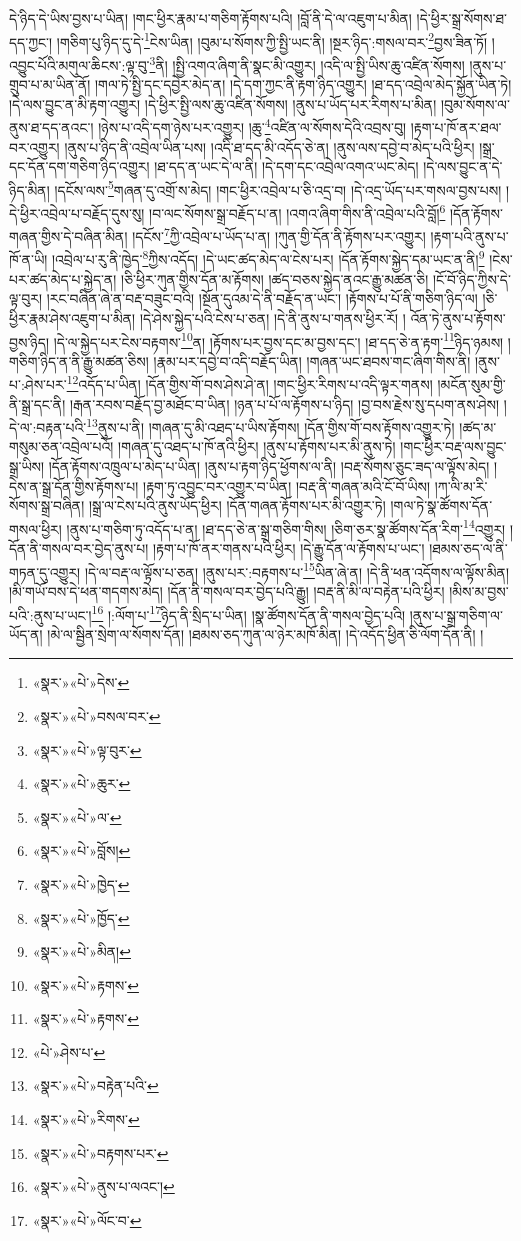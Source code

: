དེ་ཉིད་དེ་ཡིས་བྱས་པ་ཡིན། །གང་ཕྱིར་རྣམ་པ་གཅིག་རྟོགས་པའི། །བློ་ནི་དེ་ལ་འཇུག་པ་མིན། །དེ་ཕྱིར་སྒྲ་སོགས་ཐ་དད་ཀྱང་། །གཅིག་པུ་ཉིད་དུ་དེ་\footnote{«སྣར་»«པེ་»དེས་}ངེས་ཡིན། །བུམ་པ་སོགས་ཀྱི་སྤྱི་ཡང་ནི། །སྔར་ཉིད་:གསལ་བར་\footnote{«སྣར་»«པེ་»བསལ་བར་}བྱས་ཟིན་ཏོ། །འབྱུང་པོའི་མགུལ་ཆིངས་:ལྟ་བུ་\footnote{«སྣར་»«པེ་»ལྟ་བུར་}ནི། །སྤྱི་འགའ་ཞིག་ནི་སྣང་མི་འགྱུར། །འདི་ལ་སྤྱི་ཡིས་ཆུ་འཛིན་སོགས། །ནུས་པ་གྲུབ་པ་མ་ཡིན་ནོ། །གལ་ཏེ་སྤྱི་དང་དབྱེར་མེད་ན། །དེ་དག་ཀྱང་ནི་རྟག་ཉིད་འགྱུར། །ཐ་དད་འབྲེལ་མེད་སྐྱོན་ཡིན་ཏེ། །དེ་ལས་བྱུང་ན་མི་རྟག་འགྱུར། །དེ་ཕྱིར་སྤྱི་ལས་ཆུ་འཛིན་སོགས། །ནུས་པ་ཡོད་པར་རིགས་པ་མིན། །བུམ་སོགས་ལ་ནུས་ཐ་དད་ནའང་། །ཉེས་པ་འདི་དག་ཉེས་པར་འགྱུར། །ཆུ་\footnote{«སྣར་»«པེ་»ཆུར་}འཛིན་ལ་སོགས་དེའི་འབྲས་བུ། །རྟག་པ་ཁོ་ནར་ཐལ་བར་འགྱུར། །ནུས་པ་ཉིད་ནི་འབྲེལ་ཡིན་པས། །འདི་ཐ་དད་མི་འདོད་ཅེ་ན། །ནུས་ལས་དབྱེ་བ་མེད་པའི་ཕྱིར། །སྒྲ་དང་དོན་དག་གཅིག་ཉིད་འགྱུར། །ཐ་དད་ན་ཡང་དེ་ལ་ནི། །དེ་དག་དང་འབྲེལ་འགའ་ཡང་མེད། །དེ་ལས་བྱུང་ན་དེ་ཉིད་མིན། །དངོས་ལས་\footnote{«སྣར་»«པེ་»ལ་}གཞན་དུ་འགྲོ་ས་མེད། །གང་ཕྱིར་འབྲེལ་པ་ཅི་འདྲ་བ། །དེ་འདྲ་ཡོད་པར་གསལ་བྱས་པས། །དེ་ཕྱིར་འབྲེལ་པ་བརྗོད་དུས་སུ། །བ་ལང་སོགས་སྒྲ་བརྗོད་པ་ན། །འགའ་ཞིག་གིས་ནི་འབྲེལ་པའི་བློ།\footnote{«སྣར་»«པེ་»བློས།} །དོན་རྟོགས་གཞན་གྱིས་དེ་བཞིན་མིན། །དངོས་\footnote{«སྣར་»«པེ་»ཁྱེད་}ཀྱི་འབྲེལ་པ་ཡོད་པ་ན། །ཀུན་གྱི་དོན་ནི་རྟོགས་པར་འགྱུར། །རྟག་པའི་ནུས་པ་ཁོ་ན་ཡི། །འབྲེལ་པ་རུ་ནི་ཁྱེད་\footnote{«སྣར་»«པེ་»ཁྱོད་}ཀྱིས་འདོད། །དེ་ཡང་ཚད་མེད་ལ་ངེས་པར། །དོན་རྟོགས་སྐྱེད་དམ་ཡང་ན་ནི།\footnote{«སྣར་»«པེ་»མིན།} །ངེས་པར་ཚད་མེད་པ་སྐྱེད་ན། །ཅི་ཕྱིར་ཀུན་གྱིས་དོན་མ་རྟོགས། །ཚད་བཅས་སྐྱེད་ནའང་རྒྱུ་མཚན་ཅི། །ངོ་བོ་ཉིད་ཀྱིས་དེ་ལྟ་བུར། །རང་བཞིན་ཞེ་ན་བརྡ་བཟུང་བའི། །སྔོན་དུའམ་དེ་ནི་བརྗོད་ན་ཡང་། །རྟོགས་པ་པོ་ནི་གཅིག་ཉིད་ལ། །ཅི་ཕྱིར་རྣམ་ཤེས་འཇུག་པ་མིན། །དེ་ཤེས་སྐྱེད་པའི་ངེས་པ་ཅན། །དེ་ནི་ནུས་པ་གནས་ཕྱིར་རོ། །
འོན་ཏེ་ནུས་པ་རྟོགས་བྱས་ཉིད། །དེ་ལ་སྐྱེད་པར་ངེས་བརྟགས་\footnote{«སྣར་»«པེ་»རྟགས་}ན། །རྟོགས་པར་བྱས་དང་མ་བྱས་དང་། །ཐ་དད་ཅེ་ན་རྟག་\footnote{«སྣར་»«པེ་»རྟགས་}ཉིད་ཉམས། །གཅིག་ཉིད་ན་ནི་རྒྱུ་མཚན་ཅིས། །རྣམ་པར་དབྱེ་བ་འདི་བརྗོད་ཡིན། །གཞན་ཡང་ཐབས་གང་ཞིག་གིས་ནི། །ནུས་པ་:ཤེས་པར་\footnote{«པེ་»ཤེས་པ་}འདོད་པ་ཡིན། །དོན་གྱིས་གོ་བས་ཤེས་ཤེ་ན། །གང་ཕྱིར་རིགས་པ་འདི་ལྟར་གནས། །མངོན་སུམ་གྱི་ནི་སྒྲ་དང་ནི། །རྒན་རབས་བརྗོད་བྱ་མཐོང་བ་ཡིན། །ཉན་པ་པོ་ལ་རྟོགས་པ་ཉིད། །བྱ་བས་རྗེས་སུ་དཔག་ནས་ཤེས། །དེ་ལ་:བརྟན་པའི་\footnote{«སྣར་»«པེ་»བརྟེན་པའི་}ནུས་པ་ནི། །གཞན་དུ་མི་འཐད་པ་ཡིས་རྟོགས། །དོན་གྱིས་གོ་བས་རྟོགས་འགྱུར་ཏེ། །ཚད་མ་གསུམ་ཅན་འབྲེལ་པའོ། །གཞན་དུ་འཐད་པ་ཁོ་ནའི་ཕྱིར། །ནུས་པ་རྟོགས་པར་མི་ནུས་ཏེ། །གང་ཕྱིར་བརྡ་ལས་བྱུང་སྒྲ་ཡིས། །དོན་རྟོགས་འཁྲུལ་པ་མེད་པ་ཡིན། །ནུས་པ་རྟག་ཉིད་ཕྱོགས་ལ་ནི། །བརྡ་སོགས་ཅུང་ཟད་ལ་ལྟོས་མེད། །དེས་ན་སྒྲ་དོན་གྱིས་རྟོགས་པ། །རྟག་ཏུ་འབྱུང་བར་འགྱུར་བ་ཡིན། །བརྡ་ནི་གཞན་མའི་ངོ་བོ་ཡིས། །ཀ་ལི་མ་རི་སོགས་སྒྲ་བཞིན། །སྒྲ་ལ་ངེས་པའི་ནུས་ཡོད་ཕྱིར། །དོན་གཞན་རྟོགས་པར་མི་འགྱུར་ཏེ། །གལ་ཏེ་སྣ་ཚོགས་དོན་གསལ་ཕྱིར། །ནུས་པ་གཅིག་ཏུ་འདོད་པ་ན། །ཐ་དད་ཅེ་ན་སྒྲ་གཅིག་གིས། །ཅིག་ཅར་སྣ་ཚོགས་དོན་རིག་\footnote{«སྣར་»«པེ་»རིགས་}འགྱུར། །དོན་ནི་གསལ་བར་བྱེད་ནུས་པ། །རྟག་པ་ཁོ་ནར་གནས་པའི་ཕྱིར། །དེ་རྒྱུ་དོན་ལ་རྟོགས་པ་ཡང་། །ཐམས་ཅད་ལ་ནི་གཏན་དུ་འགྱུར། །དེ་ལ་བརྡ་ལ་ལྟོས་པ་ཅན། །ནུས་པར་:བརྟགས་པ་\footnote{«སྣར་»«པེ་»བརྟགས་པར་}ཡིན་ཞེ་ན། །དེ་ནི་ཕན་འདོགས་ལ་ལྟོས་མིན། །མི་གཡོ་བས་དེ་ཕན་གདགས་མེད། །དོན་ནི་གསལ་བར་བྱེད་པའི་རྒྱུ། །བརྡ་ནི་མི་ལ་བརྟེན་པའི་ཕྱིར། །མིས་མ་བྱས་པའི་:ནུས་པ་ཡང་།\footnote{«སྣར་»«པེ་»ནུས་པ་ལའང་།} །:ལོག་པ་\footnote{«སྣར་»«པེ་»ལོང་བ་}ཉིད་ནི་སྲིད་པ་ཡིན། །སྣ་ཚོགས་དོན་ནི་གསལ་བྱེད་པའི། །ནུས་པ་སྒྲ་གཅིག་ལ་ཡོད་ན། །མེ་ལ་སྦྱིན་སྲེག་ལ་སོགས་དོན། །ཐམས་ཅད་ཀུན་ལ་ཉེར་མཁོ་མིན། །དེ་འདོད་ཕྱིན་ཅི་ལོག་དོན་ནི། །
